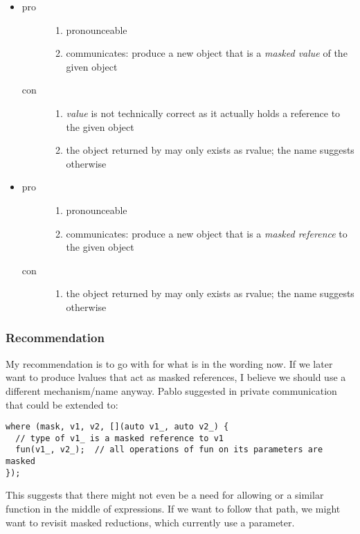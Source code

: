 \begin{itemize}
  \item {}
    \begin{description}
      \item[pro]
        \begin{enumerate}
          \item pronounceable
          \item communicates: produce a new object that is a \emph{masked value} of the given object
        \end{enumerate}
      \item[con]
        \begin{enumerate}
          \item \emph{value} is not technically correct as it actually holds a reference to the given object
          \item the object returned by  may only exists as rvalue;
            the name suggests otherwise
        \end{enumerate}
    \end{description}

  \item {}
    \begin{description}
      \item[pro]
        \begin{enumerate}
          \item pronounceable
          \item communicates: produce a new object that is a \emph{masked reference} to the given object
        \end{enumerate}
      \item[con]
        \begin{enumerate}
          \item the object returned by  may only exists as rvalue;
            the name suggests otherwise
        \end{enumerate}
    \end{description}

\end{itemize}

\subsubsection{Recommendation}
My recommendation is to go with  for what is in the wording now.
If we later want to produce lvalues that act as masked references, I believe we should use a different mechanism/name anyway.
Pablo suggested in private communication that  could be extended to:
\begin{lstlisting}[style=Vc]
where (mask, v1, v2, [](auto v1_, auto v2_) {
  // type of v1_ is a masked reference to v1
  fun(v1_, v2_);  // all operations of fun on its parameters are masked
});
\end{lstlisting}
This suggests that there might not even be a need for allowing  or a similar function in the middle of expressions.
If we want to follow that path, we might want to revisit masked reductions, which currently use a  parameter.

